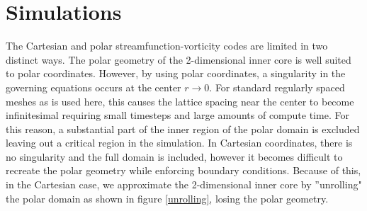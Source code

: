 \documentclass{article}
\begin{document}
\section*{Simulations}
The Cartesian and polar streamfunction-vorticity codes are limited in two 
distinct ways. The polar geometry of the 2-dimensional inner core is well 
suited to polar coordinates. However, by using polar coordinates, a 
singularity in the governing equations occurs at the center 
$r \rightarrow 0$. For standard regularly spaced meshes as is used here, 
this causes the lattice spacing near the center to become infinitesimal 
requiring small timesteps and large amounts of compute time. For this 
reason, a substantial part of the inner region of the polar domain is excluded leaving out a 
critical region in the simulation. In Cartesian coordinates, there is no 
singularity and the full domain is included, however it becomes difficult 
to recreate the polar geometry while enforcing boundary conditions. Because of this, in the Cartesian case, we approximate the 2-dimensional inner core 
by ''unrolling" the polar domain as shown in figure \ref{unrolling}, losing the polar geometry.
\end{document}
